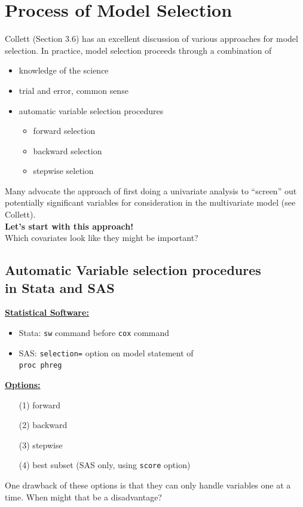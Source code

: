 \documentclass[11pt]{book}
\begin{document}
\section{Process of Model Selection}
Collett (Section 3.6) has an excellent discussion of various
approaches for model selection.  
\newpage
\noindent 
In practice, model selection
proceeds through a combination of
\begin{itemize}
\item  knowledge of the science
\item  trial and error, common sense
\item  automatic variable selection procedures
\begin{itemize}
\item forward selection
\item backward selection
\item stepwise seletion
\end{itemize}
\end{itemize}
Many advocate the approach of first doing a univariate
analysis to ``screen'' out potentially significant variables
for consideration in the multivariate model (see Collett).
\\[2ex]
{\bf Let's start with this approach!}
\\[2ex]
\noindent
Which covariates look like they might be important?
\subsection{Automatic Variable selection procedures\\
in Stata and SAS}
\underline{\bf Statistical Software:}
\begin{itemize}
\item Stata: {\tt sw} command before {\tt cox} command
\item SAS: {\tt selection=} option on model statement of \\{\tt proc phreg}
\end{itemize}
\underline{\bf Options:}
\begin{itemize}
\item[(1)] forward
\item[(2)] backward
\item[(3)] stepwise
\item[(4)] best subset (SAS only, using {\tt score} option)
\end{itemize}
One drawback of these options is that they can only handle
variables one at a time.  When might that be a disadvantage?
\end{document}
